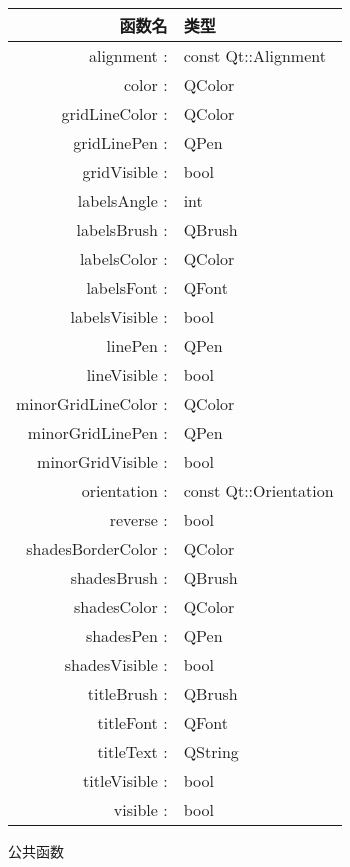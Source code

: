 \begin{tabular}{|r|l|}
\hline
函数名 & 类型 \\
\hline
alignment :&	const Qt::Alignment\\
\hline
color :&	QColor\\
\hline
gridLineColor :&	QColor\\
\hline
gridLinePen :&	QPen\\
\hline
gridVisible :&	bool\\
\hline
labelsAngle :&	int\\
\hline
labelsBrush :&	QBrush\\
\hline
labelsColor :&	QColor\\
\hline
labelsFont :&	QFont\\
\hline
labelsVisible :&	bool\\
\hline
linePen :&	QPen\\
\hline
lineVisible :&	bool\\
\hline
minorGridLineColor :&	QColor\\
\hline
minorGridLinePen :&	QPen\\
\hline
minorGridVisible :&	bool\\
\hline
orientation :&	const Qt::Orientation\\
\hline
reverse :&	bool\\
\hline
shadesBorderColor :&	QColor\\
\hline
shadesBrush :&	QBrush\\
\hline
shadesColor :&	QColor\\
\hline
shadesPen :&	QPen\\
\hline
shadesVisible :&	bool\\
\hline
titleBrush :&	QBrush\\
\hline
titleFont :&	QFont\\
\hline
titleText :&	QString\\
\hline
titleVisible :&	bool\\
\hline
visible :&	bool\\
\hline
\end{tabular}

公共函数

